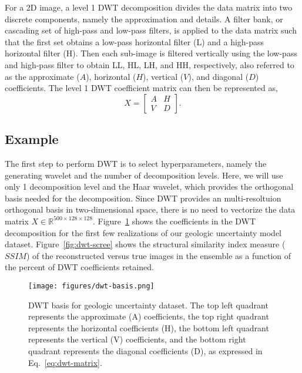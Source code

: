 \documentclass[a4paper,fleqn,12pt]{article}
\begin{document}
For a 2D image, a level 1 DWT decomposition divides the data matrix into two discrete components, namely the approximation and details. A filter bank, or cascading set of high-pass and low-pass filters, is applied to the data matrix such that the first set obtains a low-pass horizontal filter (L) and a high-pass horizontal filter (H). Then each sub-image is filtered vertically using the low-pass and high-pass filter to obtain LL, HL, LH, and HH, respectively, also referred to as the approximate ($A$), horizontal ($H$), vertical ($V$), and diagonal ($D$) coefficients. The level 1 DWT coefficient matrix can then be represented as,
\begin{equation}\label{eq:dwt-matrix}
    X = \left[\begin{array}{cccc} A & H \\ V & D \end{array}\right] .
\end{equation}

\subsection*{Example}
The first step to perform DWT is to select hyperparameters, namely the generating wavelet and the number of decomposition levels. Here, we will use only 1 decomposition level and the Haar wavelet, which provides the orthogonal basis needed for the decomposition. Since DWT provides an multi-resoltuion orthogonal basis in two-dimensional space, there is no need to vectorize the data matrix $X\in\mathbb{R}^{500\times128\times128}$. Figure~\ref{fig:dwt-basis} shows the coefficients in the DWT decomposition for the first few realizations of our geologic uncertainty model dataset. Figure~\ref{fig:dwt-scree} shows the structural similarity index measure ($SSIM$) of the reconstructed versus true images in the ensemble as a function of the percent of DWT coefficients retained. 

\begin{figure}[H]
    \centering
    \texttt{[image: figures/dwt-basis.png]}
    \caption{DWT basis for geologic uncertainty dataset. The top left quadrant represents the approximate (A) coefficients, the top right quadrant represents the horizontal coefficients (H), the bottom left quadrant represents the vertical (V) coefficients, and the bottom right quadrant represents the diagonal coefficients (D), as expressed in Eq.~\ref{eq:dwt-matrix}.}
    \label{fig:dwt-basis}
\end{figure}
\end{document}
